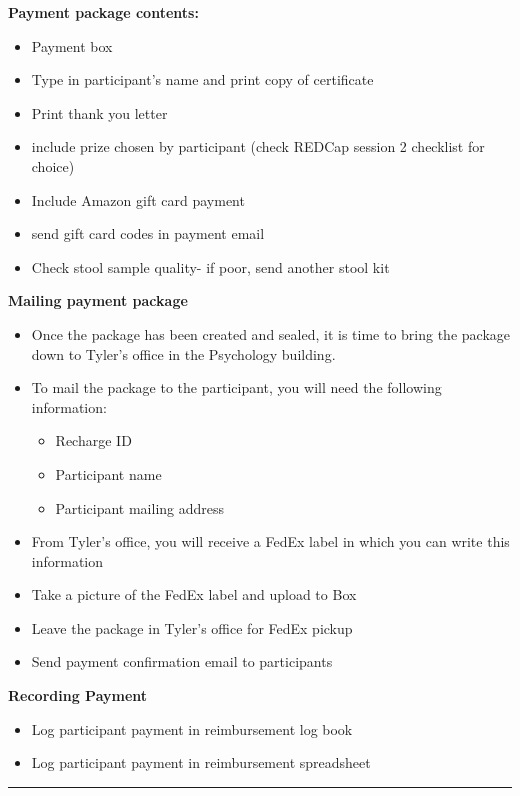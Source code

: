 \documentclass[]{book}
\begin{document}
\textbf{Payment package contents:}

\begin{itemize}
\item
  Payment box
\item
  Type in participant's name and print copy of certificate
\item
  Print thank you letter
\item
  include prize chosen by participant (check REDCap session 2 checklist for choice)
\item
  Include Amazon gift card payment
\item
  send gift card codes in payment email
\item
  Check stool sample quality- if poor, send another stool kit
\end{itemize}

\textbf{Mailing payment package}

\begin{itemize}
\item
  Once the package has been created and sealed, it is time to bring the package down to Tyler's office in the Psychology building.
\item
  To mail the package to the participant, you will need the following information:

  \begin{itemize}
  \item
    Recharge ID
  \item
    Participant name
  \item
    Participant mailing address
  \end{itemize}
\item
  From Tyler's office, you will receive a FedEx label in which you can write this information
\item
  Take a picture of the FedEx label and upload to Box
\item
  Leave the package in Tyler's office for FedEx pickup
\item
  Send payment confirmation email to participants
\end{itemize}

\textbf{Recording Payment}

\begin{itemize}
\item
  Log participant payment in reimbursement log book
\item
  Log participant payment in reimbursement spreadsheet
\end{itemize}

\begin{center}\rule{0.5\linewidth}{0.5pt}\end{center}


\end{document}
